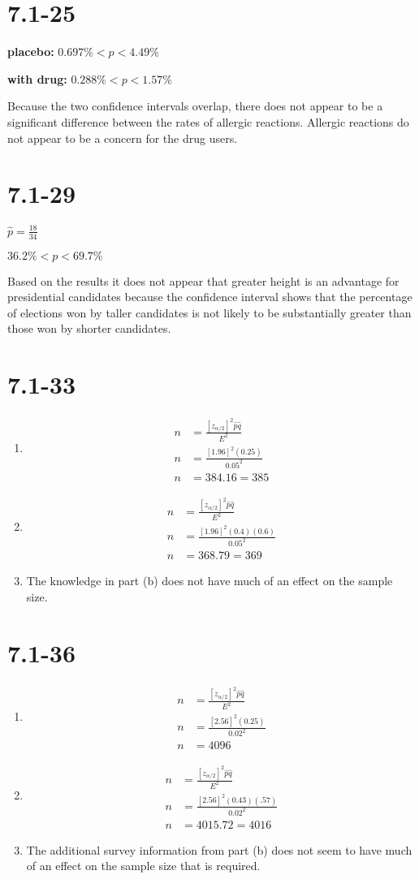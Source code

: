 \documentclass[12pt,fleqn]{article}
\newcommand{\chapter}{7.1}
\newcommand{\problem}[1]{\vspace{5ex}\section*{\chapter-#1}}
\begin{document}
\problem{25}
\textbf{placebo:} $0.697\% < p < 4.49\%$

\textbf{with drug:} $0.288\% < p < 1.57\%$

Because the two confidence intervals overlap, there does not appear to be a significant difference between the rates of allergic reactions. Allergic reactions do not appear to be a concern for the drug users.

\problem{29}
$\hat{p} = \frac{18}{34}$

$36.2\% < p < 69.7\%$

Based on the results it does not appear that greater height is an advantage for presidential candidates because the confidence interval shows that the percentage of elections won by taller candidates is not likely to be substantially greater than those won by shorter candidates.


\problem{33}
\begin{enumerate}[label=\alph*.]
\item
  \begin{align*}
    n &= \frac{{[z_{\alpha/2}]}^2 \hat{p} \hat{q}}{E^2} \\
    n &= \frac{{[1.96]}^2(0.25)}{0.05^2} \\
    n &= 384.16 = 385
  \end{align*}
\item
  \begin{align*}
    n &= \frac{{[z_{\alpha/2}]}^2 \hat{p} \hat{q}}{E^2} \\
    n &= \frac{{[1.96]}^2(0.4)(0.6)}{0.05^2} \\
    n &= 368.79 = 369
  \end{align*}
\item The knowledge in part (b) does not have much of an effect on the sample size.
\end{enumerate}


\problem{36}
\begin{enumerate}[label=\alph*.]
\item
  \begin{align*}
    n &= \frac{{[z_{\alpha/2}]}^2 \hat{p} \hat{q}}{E^2} \\
    n &= \frac{{[2.56]}^2(0.25)}{0.02^2} \\
    n &= 4096
  \end{align*}
\item
  \begin{align*}
    n &= \frac{{[z_{\alpha/2}]}^2 \hat{p} \hat{q}}{E^2} \\
    n &= \frac{{[2.56]}^2(0.43)(.57)}{0.02^2} \\
    n &= 4015.72 = 4016
  \end{align*}
\item The additional survey information from part (b) does not seem to have much of an effect on the sample size that is required.
\end{enumerate}
\end{document}
